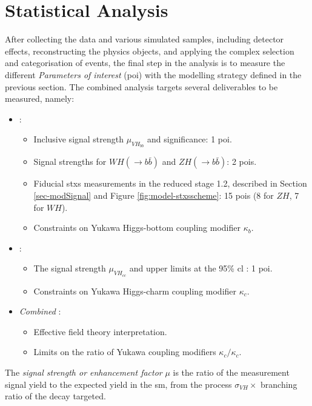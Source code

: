 \section{Statistical Analysis}\label{sec-fitFramework}
After collecting the data and various simulated samples, including detector effects, reconstructing the physics objects, and applying the complex selection and categorisation of events, the final step in the analysis is to measure the different \textit{Parameters of interest} (\gls{poi}) with the modelling strategy defined in the previous section. The combined analysis targets several deliverables to be measured, namely:
\begin{itemize}[leftmargin=*]
\item \textit{\vhb}: 
    \begin{itemize}
        \item Inclusive signal strength $\mu_{VH_{bb}}$ and significance: 1 \gls{poi}.
        \item Signal strengths for $WH(\rightarrow b\bar{b})$ and $ZH(\rightarrow b\bar{b})$: 2 \gls{poi}s.
        \item Fiducial \gls{stxs} measurements in the reduced stage 1.2, described in Section \ref{sec-modSignal} and Figure \ref{fig:model-stxsscheme}: 15 \gls{poi}s (8 for $ZH$, 7 for $WH$).
        \item Constraints on Yukawa Higgs-bottom coupling modifier $\kappa_b$. %
    \end{itemize}
\item \textit{\vhc}:
    \begin{itemize}
        \item The signal strength $\mu_{VH_{cc}}$ and upper limits at the 95\% \gls{cl} : 1 \gls{poi}.
        \item Constraints on Yukawa Higgs-charm coupling modifier $\kappa_c$. %
    \end{itemize}
\item \textit{Combined \vhbc}: 
    \begin{itemize}
        \item Effective field theory interpretation.
        \item Limits on the ratio of Yukawa coupling modifiers $\kappa_c / \kappa_c$. %
    \end{itemize}
\end{itemize}

The \textit{signal strength or enhancement factor} $\mu$ is the ratio of the measurement signal yield to the expected yield in the \gls{sm}, from the process $\sigma_{VH} \times$ branching ratio of the decay targeted.

